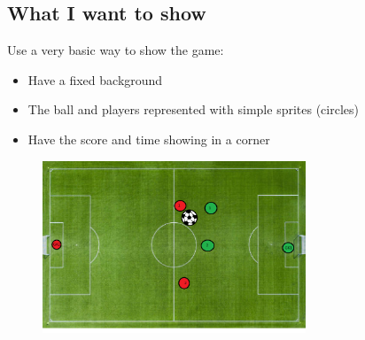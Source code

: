 \documentclass{article}
\theoremstyle{mytheoremstyle}
\theoremstyle{mytheoremstyle}
\theoremstyle{myproblemstyle}
\begin{document}
    \newpage
    \subsection{What I want to show}
    Use a very basic way to show the game:
    \begin{itemize}
        \item Have a fixed background
        \item The ball and players represented with simple sprites (circles)
        \item Have the score and time showing in a corner
    \end{itemize}

    \begin{figure}[h]
        \begin{center}
            \includegraphics[width=0.7\textwidth]{Images/prototype.png}        
        \end{center}
    \end{figure}
    
\end{document}
